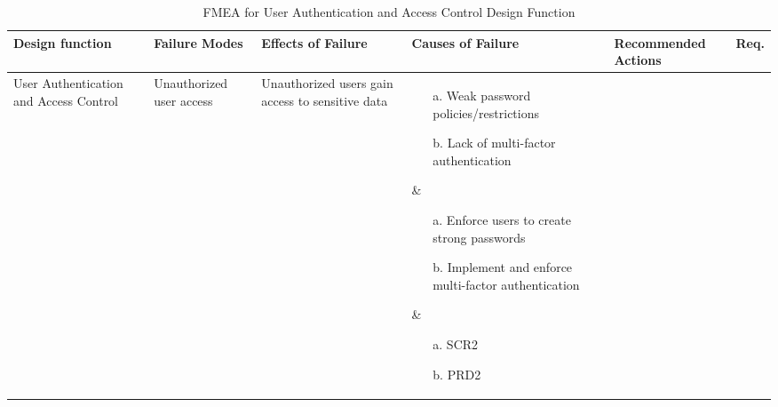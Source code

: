 \documentclass{article}
\begin{document}

\begin{landscape}

\begin{table}
\centering
\caption{FMEA for User Authentication and Access Control Design Function}
\begin{tabular}{|p{2.5cm}|p{3cm}|p{3cm}|p{5cm}|p{5cm}|p{2cm}|}
\hline
\textbf{Design function} & \textbf{Failure Modes} & \textbf{Effects of Failure} & \textbf{Causes of Failure} & \textbf{Recommended Actions} & \textbf{Req.} \\ \hline

\parbox[t]{2.5cm}{\raggedright User Authentication and Access Control} & \parbox[t]{3cm}{\raggedright Unauthorized user access} & \parbox[t]{3cm}{\raggedright Unauthorized users gain access to sensitive data} &
\parbox[t]{5cm}{\raggedright
    \begin{enumerate}
      \item[a.] Weak password policies/restrictions
      \item[b.] Lack of multi-factor authentication
    \end{enumerate}
  } &
\parbox[t]{5cm}{\raggedright
    \begin{enumerate}
        \item[a.] Enforce users to create strong passwords
        \item[b.] Implement and enforce multi-factor authentication
    \end{enumerate}
} &

\parbox[t]{2cm}{\raggedright
    \begin{enumerate}
        \item[a.] SCR2
        \item[b.] PRD2
    \end{enumerate}
}
\\ \hline


\end{tabular}
\end{table}
\end{landscape}
\end{document}
